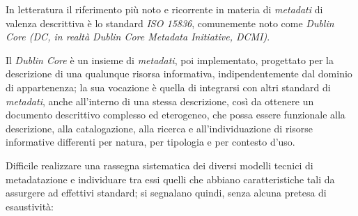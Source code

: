 \documentclass[
  b5paper,
  twoside,
  11pt,
  chapterprefix=false,
  bibliography=totocnumbered,
  listof=flat]{scrbook}
\begin{document}
In letteratura il riferimento più noto e ricorrente in materia di
\emph{metadati} di valenza descrittiva è lo standard \emph{ISO 15836}, comunemente
noto come \emph{Dublin Core (DC, in realtà Dublin Core Metadata Initiative,
DCMI)}.

Il \emph{Dublin Core} è un insieme di \emph{metadati}, poi implementato,
progettato per la descrizione di una qualunque risorsa informativa,
indipendentemente dal dominio di appartenenza; la sua vocazione è quella
di integrarsi con altri standard di \emph{metadati}, anche all'interno di una
stessa descrizione, così da ottenere un documento descrittivo complesso
ed eterogeneo, che possa essere funzionale alla descrizione, alla
catalogazione, alla ricerca e all'individuazione di risorse informative
differenti per natura, per tipologia e per contesto d'uso.

Difficile realizzare una rassegna sistematica dei diversi modelli
tecnici di metadatazione e individuare tra essi quelli che abbiano
caratteristiche tali da assurgere ad effettivi standard; si segnalano
quindi, senza alcuna pretesa di esaustività:
\end{document}
